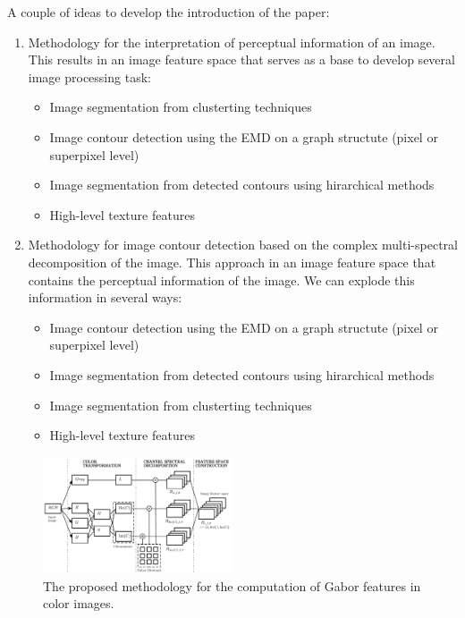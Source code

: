 \documentclass[journal]{IEEEtran}
\begin{document}
A couple of ideas to develop the introduction of the paper:
\begin{enumerate}
	\item Methodology for the interpretation of perceptual information of an image. This results in an image feature space that serves as a base to develop several image processing task:
	\begin{itemize}
		\item Image segmentation from clusterting techniques
		\item Image contour detection using the EMD on a graph structute (pixel or superpixel level)
		\item Image segmentation from detected contours using hirarchical methods
		\item High-level texture features
	\end{itemize}	 
	
	\item Methodology for image contour detection based on the complex multi-spectral decomposition of the image. This approach in an image feature space that contains the perceptual information of the image. We can explode this information in several ways:
	\begin{itemize}
		\item Image contour detection using the EMD on a graph structute (pixel or superpixel level)
		\item Image segmentation from detected contours using hirarchical methods
		\item Image segmentation from clusterting techniques
		\item High-level texture features
	\end{itemize}	
\end{enumerate}


\begin{figure}[!ht]
	\centering
	\includegraphics[width=0.5\textwidth]{gabor_color_feature_extraction_diagram}
	\caption{The proposed methodology for the computation of Gabor features in color images.}\label{fig:proposed_pipeline_gabor_feature_extraction}
\end{figure}
\end{document}
